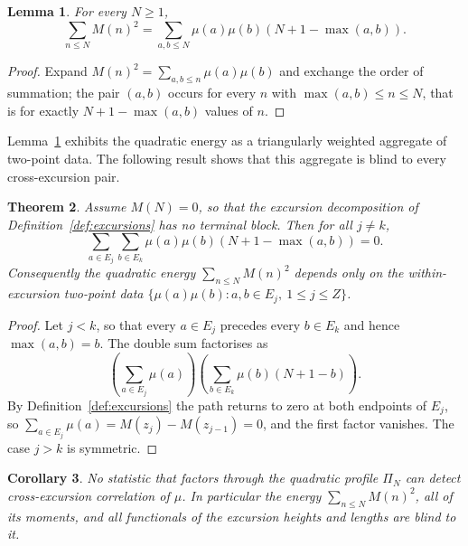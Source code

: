 \documentclass[11pt]{amsart}
\numberwithin{equation}{section}
\theoremstyle{plain}
\newtheorem{theorem}{Theorem}[section]
\newtheorem{lemma}[theorem]{Lemma}
\newtheorem{corollary}[theorem]{Corollary}
\theoremstyle{definition}
\theoremstyle{remark}
\begin{document}
\begin{lemma}
\label{lem:energy_as_two_point}
For every $N \ge 1$,
\begin{equation}
\sum_{n \le N} M(n)^2
= \sum_{a,b \le N} \mu(a)\mu(b) \left( N + 1 - \max(a,b) \right).
\label{eq:energy_as_two_point}
\end{equation}
\end{lemma}

\begin{proof}
Expand $M(n)^2 = \sum_{a,b \le n} \mu(a)\mu(b)$ and exchange the order
of summation; the pair $(a,b)$ occurs for every $n$ with
$\max(a,b) \le n \le N$, that is for exactly $N + 1 - \max(a,b)$ values
of $n$.
\end{proof}

Lemma~\ref{lem:energy_as_two_point} exhibits the quadratic energy as a
triangularly weighted aggregate of two-point data. The following result
shows that this aggregate is blind to every cross-excursion pair.

\begin{theorem}
\label{thm:cross_excursion_vanishing}
Assume $M(N) = 0$, so that the excursion decomposition of
Definition~\ref{def:excursions} has no terminal block. Then for all
$j \neq k$,
\begin{equation}
\sum_{a \in E_j} \sum_{b \in E_k}
\mu(a)\mu(b)\left( N + 1 - \max(a,b) \right) = 0 .
\label{eq:cross_excursion_vanishing}
\end{equation}
Consequently the quadratic energy $\sum_{n \le N} M(n)^2$ depends only
on the within-excursion two-point data
$\{\mu(a)\mu(b) : a, b \in E_j,\ 1 \le j \le Z\}$.
\end{theorem}

\begin{proof}
Let $j < k$, so that every $a \in E_j$ precedes every $b \in E_k$ and
hence $\max(a,b) = b$. The double sum factorises as
\begin{equation}
\left( \sum_{a \in E_j} \mu(a) \right)
\left( \sum_{b \in E_k} \mu(b)\left(N+1-b\right) \right).
\label{eq:cross_excursion_factorisation}
\end{equation}
By Definition~\ref{def:excursions} the path returns to zero at both
endpoints of $E_j$, so $\sum_{a \in E_j} \mu(a) =
M(z_j) - M(z_{j-1}) = 0$, and the first factor vanishes. The case
$j > k$ is symmetric.
\end{proof}

\begin{corollary}
\label{cor:profile_blindness}
No statistic that factors through the quadratic profile $\Pi_N$ can
detect cross-excursion correlation of $\mu$. In particular the energy
$\sum_{n \le N} M(n)^2$, all of its moments, and all functionals of the
excursion heights and lengths are blind to it.
\end{corollary}
\end{document}
